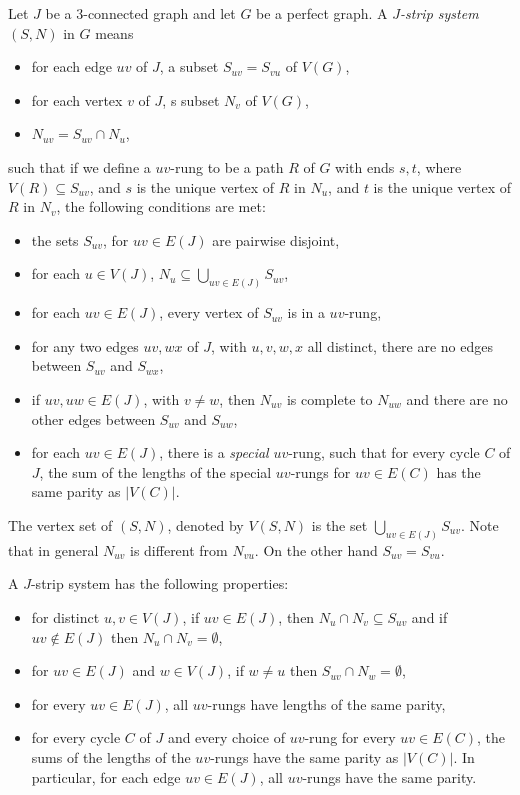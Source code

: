 \begin{defnTwo}
  Let $J$ be a 3-connected graph and let $G$ be a perfect graph. A \emph{$J$-strip system} $(S, N)$ in $G$ means
  \begin{itemize}
    \item for each edge $uv$ of $J$, a subset $S_{uv} = S_{vu}$ of $V(G)$,
    \item for each vertex $v$ of $J$, s subset $N_v$ of $V(G)$,
    \item $N_{uv} = S_{uv} \cap N_u$,
  \end{itemize}
  such that if we define a $uv$-rung to be a path $R$ of $G$ with ends $s, t$, where $V(R) \subseteq S_{uv}$, and $s$ is the unique vertex of $R$ in $N_u$, and $t$ is the unique vertex of $R$ in $N_v$, the following conditions are met:
  \begin{itemize}
    \item the sets $S_{uv}$, for $uv \in E(J)$ are pairwise disjoint,
    \item for each $u \in V(J)$, $N_u \subseteq \bigcup_{uv \in E(J)} S_{uv}$,
    \item for each $uv \in E(J)$, every vertex of $S_{uv}$ is in a $uv$-rung,
    \item for any two edges $uv, wx$ of $J$, with $u, v, w, x$ all distinct, there are no edges between $S_{uv}$ and $S_{wx}$,
    \item if $uv, uw \in E(J)$, with $v \neq w$, then $N_{uv}$ is complete to $N_{uw}$ and there are no other edges between $S_{uv}$ and $S_{uw}$,
    \item for each $uv \in E(J)$, there is a \emph{special} $uv$-rung, such that for every cycle $C$ of $J$, the sum of the lengths of the special $uv$-rungs for $uv \in E(C)$ has the same parity as $|V(C)|$.
  \end{itemize}
\end{defnTwo}

\noindent The vertex set of $(S, N)$, denoted by $V(S, N)$ is the set $\bigcup_{uv \in E(J)} S_{uv}$. Note that in general $N_{uv}$ is different from $N_{vu}$. On the other hand $S_{uv} = S_{vu}$.

A $J$-strip system has the following properties:
\begin{itemize}
  \item for distinct $u, v \in V(J)$, if $uv \in E(J)$, then $N_u \cap N_v \subseteq S_{uv}$ and if $uv \notin E(J)$ then $N_u \cap N_v = \emptyset$,
  \item for $uv \in E(J)$ and $w \in V(J)$, if $w \neq u$ then $S_{uv} \cap N_w = \emptyset$,
  \item for every $uv \in E(J)$, all $uv$-rungs have lengths of the same parity,
  \item for every cycle $C$ of $J$ and every choice of $uv$-rung for every $uv \in E(C)$, the sums of the lengths of the $uv$-rungs have the same parity as $|V(C)|$. In particular, for each edge $uv \in E(J)$, all $uv$-rungs have the same parity.
\end{itemize}

